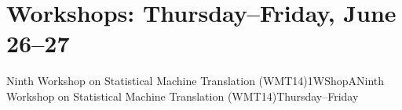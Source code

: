 \vspace*{-3cm}\par
\chapter{Workshops: Thursday--Friday, June 26--27}
\thispagestyle{emptyheader}





\clearpage
{}

\begin{wsschedule}{Ninth Workshop on Statistical Machine Translation (WMT14)}{1}{WShopA}{Ninth Workshop on Statistical Machine Translation (WMT14)}{Thursday--Friday}{\SRWLoc}
  \clearpage
\end{wsschedule}
        


